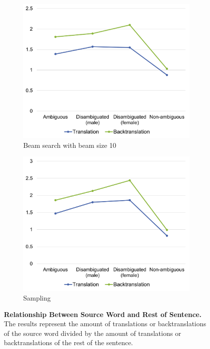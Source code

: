 \begin{figure}[!htb]
     \centering
     
     \begin{subfigure}{0.49\textwidth}
         \centering
         \includegraphics[width=\textwidth]{figures/correlation/words_beam10.png}
         \caption{Beam search with beam size 10}
         \label{fig:correlation_words_10}
     \end{subfigure}
     \hfill
     \begin{subfigure}{0.49\textwidth}
         \centering
         \includegraphics[width=\textwidth]{figures/correlation/words_sampling.png}
         \caption{Sampling}
         \label{fig:correlation_words_sampling}
     \end{subfigure}
     
    \caption{\textbf{Relationship Between Source Word and Rest of Sentence.} The results represent the amount of translations or backtranslations of the source word divided by the amount of translations or backtranslations of the rest of the sentence.}
    \label{fig:correlation_words}

\end{figure}

